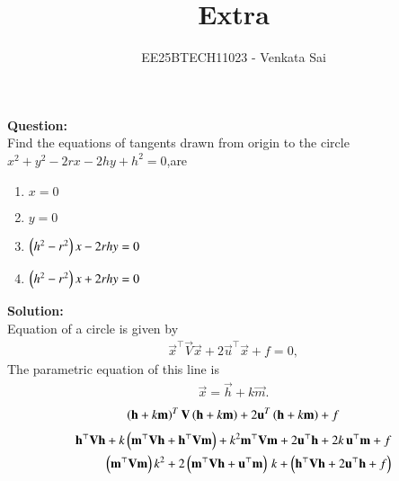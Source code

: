 \documentclass[journal]{IEEEtran}
\begin{document}


\title{Extra}
\author{EE25BTECH11023 -   Venkata Sai}
\maketitle \vspace{-1cm}
\renewcommand{\thefigure}{\theenumi}
\renewcommand{\thetable}{\theenumi}
\setlength{\intextsep}{10pt} %

\renewcommand{\thetable}{\theenumi}

\textbf{Question:}  \\
Find the equations of tangents drawn from origin to the circle $x^2+y^2-2rx-2hy+h^2=0$,are
\begin{multicols}{2}
\begin{enumerate}
    \item $x=0$
    \item $y=0$
    \item $\left(h^2-r^2\right)x-2rhy=0$
    \item $\left(h^2-r^2\right)x+2rhy=0$
\end{enumerate}
\end{multicols}
\textbf{Solution:}  \\
Equation of a circle is given by
\begin{align}
\vec{x}^\top \vec{V} \vec{x} + 2 \vec{u}^\top \vec{x} + f = 0,
\end{align}
The parametric equation of this line is
\begin{align}
\vec{x} = \vec{h} + k \vec{m}.
\end{align}
\begin{align}
\left(\mathbf{h}+k\mathbf{m}\right)^T \mathbf{V}\left(\mathbf{h}+k\mathbf{m}\right)+2\mathbf{u}^T\left(\mathbf{h}+k\mathbf{m}\right)+f
\end{align}
\begin{align}
\mathbf{h}^\top \mathbf{V} \mathbf{h}+ k\left(\mathbf{m}^\top \mathbf{V} \mathbf{h} + \mathbf{h}^\top \mathbf{V} \mathbf{m}\right)+ k^2 \mathbf{m}^\top \mathbf{V} \mathbf{m}+ 2\mathbf{u}^\top\mathbf{h} + 2k\,\mathbf{u}^\top\mathbf{m} + f \\
\left(\mathbf{m}^\top \mathbf{V} \mathbf{m}\right)k^2+2\left(\mathbf{m}^\top \mathbf{V}\mathbf{h} + \mathbf{u}^\top\mathbf{m}\right)\,k
   + \left(\mathbf{h}^\top \mathbf{V} \mathbf{h} + 2\mathbf{u}^\top\mathbf{h} + f\right)
\end{align}
\end{document}
